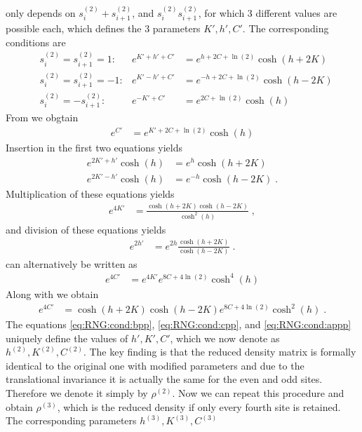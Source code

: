 %
only depends on $s^{(2)}_{i}+s^{(2)}_{i+1}$, and $s^{(2)}_{i}s^{(2)}_{i+1}$,  for which 
3 different values are possible each, which defines the 3 parameters $K',h',C'$. The corresponding 
conditions are
%
\begin{subequations}
\begin{align}
&s^{(2)}_{i}=s^{(2)}_{i+1}=1:&e^{K'  + h'  + C'} &= e^{h+ 2C + \ln(2)} \cosh(h+2K)
\label{eq:RNG:conda}\\
&s^{(2)}_{i}=s^{(2)}_{i+1}=-1:&e^{K'  - h'  + C'} &= e^{-h+ 2C + \ln(2)} \cosh(h-2K)\label{eq:RNG:condb}\\
&s^{(2)}_{i}=-s^{(2)}_{i+1}:&e^{-K'    + C'} &= e^{2C + \ln(2)} \cosh(h)\label{eq:RNG:condc}
\end{align}	
\end{subequations}
%
From  we obgtain
%
\begin{align}\label{eq:RNG:cond:app}
e^{C'} &= e^{K' + 2C + \ln(2)} \cosh(h)
\end{align}
%
Insertion in the first two equations yields
\begin{subequations}
\begin{align}
e^{2K'  + h'}\cosh(h) &= e^{h} \cosh(h+2K)
\label{eq:RNG:condap}\\
e^{2K'  - h'}\cosh(h) &= e^{-h} \cosh(h-2K)\label{eq:RNG:condbp}\;.
\end{align}	
\end{subequations}
Multiplication of these  equations yields
\begin{align}
e^{4K' } &= \frac{\cosh(h+2K)\cosh(h-2K)}{\cosh^{2}(h)}
\label{eq:RNG:cond:bpp}\;,
\end{align}	
and division  of these  equations yields
\begin{align}
e^{2h'} &= e^{2h}\frac{\cosh(h+2K)}{\cosh(h-2K)}
\label{eq:RNG:cond:cpp}\;.
\end{align}	
 can alternatively be written as
\begin{align}\label{eq:RNG:cond:app2}
e^{4C'} &= e^{4K'} e^{8C + 4\ln(2)} \cosh^{4}(h)
\end{align}
Along with  we obtain
\begin{align}\label{eq:RNG:cond:appp}
e^{4C'} &= \cosh(h+2K)\cosh(h-2K) e^{8C + 4\ln(2)} \cosh^{2}(h)\;.
\end{align}
The equations \ref{eq:RNG:cond:bpp},  \ref{eq:RNG:cond:cpp}, and  \ref{eq:RNG:cond:appp} 
uniquely define the values of $h',K',C'$, which we now denote as 
$h^{(2)},K^{(2)},C^{(2)}$. 
The key finding is that the reduced density matrix  is formally identical to the original one with modified parameters and due to the translational invariance it is actually the same for the even and odd sites. Therefore we denote it simply by $\rho^{(2)}$. Now we can repeat this procedure and obtain $\rho^{(3)}$, which is the reduced density if only every fourth site is retained. The corresponding parameters $h^{(3)},K^{(3)},C^{(3)}$
